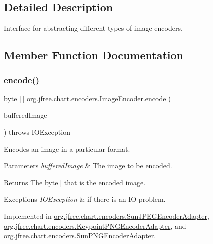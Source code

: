 \subsection{Detailed Description}
Interface for abstracting different types of image encoders. 

\subsection{Member Function Documentation}
\mbox{\label{interfaceorg_1_1jfree_1_1chart_1_1encoders_1_1_image_encoder_a3290449de5246d80ca626835e5dac183}} 
\subsubsection{\texorpdfstring{encode()}{encode()}\hspace{0.1cm}{\footnotesize\ttfamily [1/2]}}
{\footnotesize\ttfamily byte \mbox{[}$\,$\mbox{]} org.\+jfree.\+chart.\+encoders.\+Image\+Encoder.\+encode (\begin{DoxyParamCaption}\item[{Buffered\+Image}]{buffered\+Image }\end{DoxyParamCaption}) throws I\+O\+Exception}

Encodes an image in a particular format.


\begin{DoxyParams}{Parameters}
{\em buffered\+Image} & The image to be encoded.\\
\hline
\end{DoxyParams}
\begin{DoxyReturn}{Returns}
The byte\mbox{[}\mbox{]} that is the encoded image.
\end{DoxyReturn}

\begin{DoxyExceptions}{Exceptions}
{\em I\+O\+Exception} & if there is an IO problem. \\
\hline
\end{DoxyExceptions}


Implemented in \mbox{\hyperlink{classorg_1_1jfree_1_1chart_1_1encoders_1_1_sun_j_p_e_g_encoder_adapter_aee7539bd600fe8bedef71c22dc36884c}{org.\+jfree.\+chart.\+encoders.\+Sun\+J\+P\+E\+G\+Encoder\+Adapter}}, \mbox{\hyperlink{classorg_1_1jfree_1_1chart_1_1encoders_1_1_keypoint_p_n_g_encoder_adapter_addd4646d4405db17c71f6ab02265705f}{org.\+jfree.\+chart.\+encoders.\+Keypoint\+P\+N\+G\+Encoder\+Adapter}}, and \mbox{\hyperlink{classorg_1_1jfree_1_1chart_1_1encoders_1_1_sun_p_n_g_encoder_adapter_aabba217aad5303766501a159dfae6b07}{org.\+jfree.\+chart.\+encoders.\+Sun\+P\+N\+G\+Encoder\+Adapter}}.

